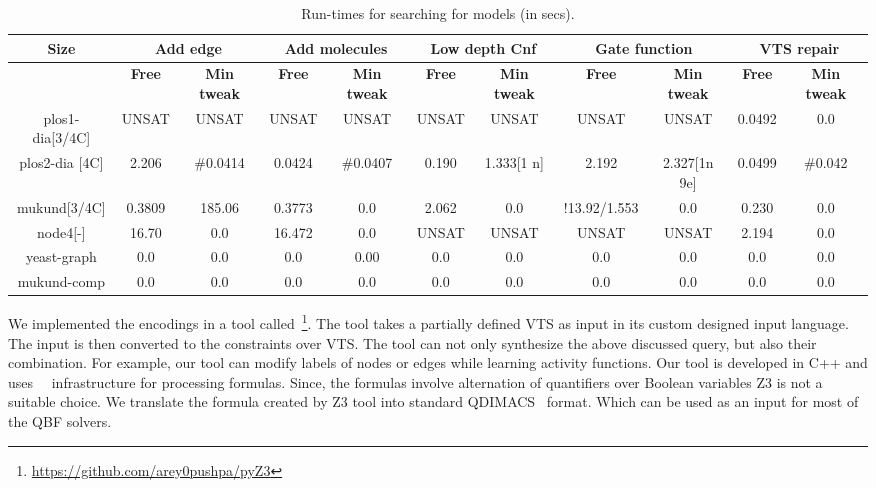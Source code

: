 
\begin{table}[t]
  \centering
  \begin{tabular}[t]{|c|c|c|c|c|c|c|c|c|c|c}\hline
    {\multirow{2}{*} \textbf{Size}}  & \multicolumn{2}{c|}{\textbf{Add edge}} & \multicolumn{2}{c|}{\textbf{Add molecules}} & \multicolumn{2}{c|}{\textbf{Low depth Cnf}}  &  \multicolumn{2}{c|}{\textbf{Gate function}} &  \multicolumn{2}{c|}{\textbf{VTS repair}} \\\hline
   
   \cline{2-9}
    {} & {\textbf{Free}} & {\textbf{Min tweak}} & {\textbf{Free}} & {\textbf{Min tweak}} & {\textbf{Free}} & {\textbf{Min tweak}} & {\textbf{Free}} & {\textbf{Min tweak}} & {\textbf{Free}} & {\textbf{Min tweak}} \\\hline
    
    plos1-dia[3/4C] & UNSAT & UNSAT & UNSAT & UNSAT & UNSAT & UNSAT & UNSAT & UNSAT & 0.0492 & 0.0\\\hline
    plos2-dia [4C] & 2.206 & \#0.0414 & 0.0424 & \#0.0407 & 0.190 & 1.333[1 n] & 2.192 & 2.327[1n 9e] & 0.0499 & \#0.042 \\\hline
    mukund[3/4C] & 0.3809 & 185.06 & 0.3773 & 0.0 & 2.062 & 0.0 & !13.92/1.553 & 0.0 & 0.230 & 0.0 \\\hline
    node4[-] & 16.70 & 0.0 & 16.472 & 0.0 & UNSAT & UNSAT & UNSAT & UNSAT & 2.194 & 0.0\\\hline
    yeast-graph & 0.0 & 0.0 & 0.0 & 0.00 & 0.0 & 0.0 & 0.0  & 0.0 & 0.0 & 0.0 \\\hline
    mukund-comp & 0.0 & 0.0 & 0.0 & 0.0 & 0.0 & 0.0 & 0.0 & 0.0 & 0.0 & 0.0\\\hline
  \end{tabular}
  \caption{Run-times for searching for models (in secs).}
  \label{tab:qf-grabh}
\end{table}


We implemented the encodings in a tool called~\ourtool\footnote{{\url{https://github.com/arey0pushpa/pyZ3}}}.
%
The tool takes a partially defined VTS as input in its custom designed
input language. The input is then converted to the constraints over VTS. 
%
The tool can not only synthesize the above discussed query, but also their
combination.
%
For example, our tool can modify labels of nodes or edges while
learning activity functions.
%
Our tool is developed in C++ and uses~\zthree~\cite{z3} infrastructure for
processing formulas. 
%
Since, the formulas involve alternation of quantifiers over Boolean variables Z3 is not a suitable choice. We translate the formula created by Z3 tool into standard QDIMACS~\cite{qdimacs} format. Which can be used as an input for most of the QBF solvers. 

